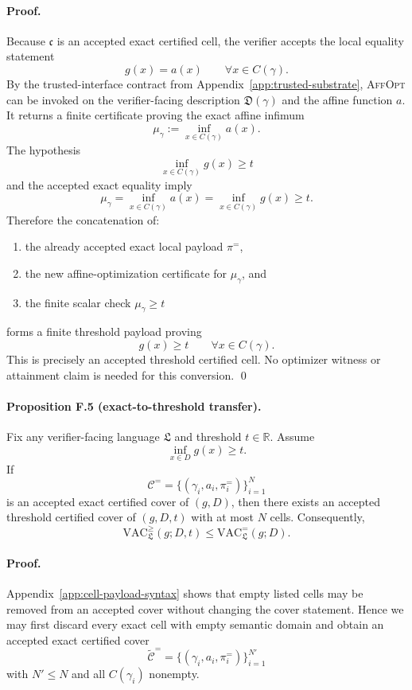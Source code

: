 \paragraph{Proof.}
Because $\mathfrak c$ is an accepted exact certified cell, the verifier accepts the local equality statement
\[
g(x)=a(x)
\qquad \forall x\in C(\gamma).
\]
By the trusted-interface contract from Appendix~\ref{app:trusted-substrate}, \textsc{AffOpt} can be invoked on the verifier-facing description $\mathfrak D(\gamma)$ and the affine function $a$. It returns a finite certificate proving the exact affine infimum
\[
\mu_\gamma
:=
\inf_{x\in C(\gamma)} a(x).
\]
The hypothesis
\[
\inf_{x\in C(\gamma)} g(x)\ge t
\]
and the accepted exact equality imply
\[
\mu_\gamma
=
\inf_{x\in C(\gamma)} a(x)
=
\inf_{x\in C(\gamma)} g(x)
\ge t.
\]
Therefore the concatenation of:
\begin{enumerate}
    \item the already accepted exact local payload $\pi^{=}$,
    \item the new affine-optimization certificate for $\mu_\gamma$, and
    \item the finite scalar check $\mu_\gamma\ge t$
\end{enumerate}
forms a finite threshold payload proving
\[
g(x)\ge t
\qquad \forall x\in C(\gamma).
\]
This is precisely an accepted threshold certified cell. No optimizer witness or attainment claim is needed for this conversion. \qed

\paragraph{Proposition F.5 (exact-to-threshold transfer).}
Fix any verifier-facing language $\mathfrak L$ and threshold $t\in\mathbb R$. Assume
\[
\inf_{x\in D} g(x)\ge t.
\]
If
\[
\mathcal C^{=}
=
\{(\gamma_i,a_i,\pi_i^{=})\}_{i=1}^N
\]
is an accepted exact certified cover of $(g,D)$, then there exists an accepted threshold certified cover of $(g,D,t)$ with at most $N$ cells. Consequently,
\[
\mathrm{VAC}^{\ge}_{\mathfrak L}(g;D,t)
\le
\mathrm{VAC}^{=}_{\mathfrak L}(g;D).
\]

\paragraph{Proof.}
Appendix~\ref{app:cell-payload-syntax} shows that empty listed cells may be removed from an accepted cover without changing the cover statement. Hence we may first discard every exact cell with empty semantic domain and obtain an accepted exact certified cover
\[
\widetilde{\mathcal C}^{=}
=
\{(\gamma_i,a_i,\pi_i^{=})\}_{i=1}^{N'}
\]
with $N'\le N$ and all $C(\gamma_i)$ nonempty.

